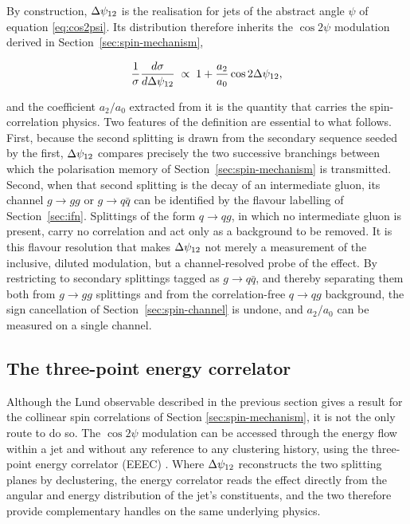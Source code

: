 By construction, $\Delta\psi_{12}$ is the realisation for jets of the abstract angle $\psi$
of equation \eqref{eq:cos2psi}. Its distribution therefore inherits the $\cos 2\psi$
modulation derived in Section~\ref{sec:spin-mechanism},

\begin{equation}
  \frac{1}{\sigma}\frac{d\sigma}{d\Delta\psi_{12}} \;\propto\;
  1 + \frac{a_2}{a_0}\cos 2\Delta\psi_{12},
  \label{eq:dpsi-modulation}
\end{equation}

and the coefficient $a_2/a_0$ extracted from it is the quantity that carries the
spin-correlation physics. Two features of the definition are essential to what
follows. First, because the second splitting is drawn from the secondary sequence
seeded by the first, $\Delta\psi_{12}$ compares precisely the two successive branchings
between which the polarisation memory of Section~\ref{sec:spin-mechanism} is
transmitted. Second, when that second splitting is the decay of an intermediate
gluon, its channel $g \to gg$ or $g \to q\bar{q}$ can be identified by the flavour
labelling of Section~\ref{sec:ifn}. Splittings of the form $q \to qg$, in which
no intermediate gluon is present, carry no correlation and act only as a
background to be removed. It is this flavour resolution that makes $\Delta\psi_{12}$ not
merely a measurement of the inclusive, diluted modulation, but a channel-resolved
probe of the effect. By restricting to secondary splittings tagged as
$g \to q\bar{q}$, and thereby separating them both from $g \to gg$ splittings and
from the correlation-free $q \to qg$ background, the sign cancellation of
Section~\ref{sec:spin-channel} is undone, and $a_2/a_0$ can be measured on a
single channel.

\subsection{The three-point energy correlator}
\label{sec:spin-eeec}

Although the Lund observable described in the previous section gives a result for the
collinear spin correlations of Section \ref{sec:spin-mechanism}, it is not the only route
to do so. The $\cos 2\psi$ modulation can be accessed through the energy flow within a jet
and without any reference to any clustering history, using the three-point energy correlator
(EEEC) \Cite{Chen_2021}. Where $\Delta\psi_{12}$ reconstructs the two splitting planes by
declustering, the energy correlator reads the effect directly from the angular and
energy distribution of the jet's constituents, and the two therefore provide
complementary handles on the same underlying physics.

